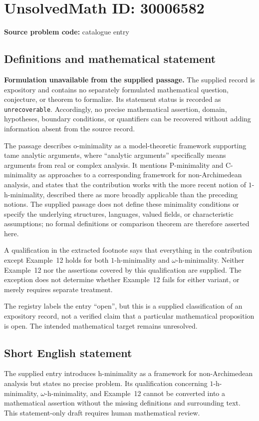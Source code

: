 \documentclass[11pt]{article}
\begin{document}
\section*{UnsolvedMath ID: 30006582}
\textbf{Source problem code:} catalogue entry
\subsection{Definitions and mathematical statement}
\textbf{Formulation unavailable from the supplied passage.} The supplied record is expository and contains no separately formulated mathematical question, conjecture, or theorem to formalize. Its statement status is recorded as \texttt{unrecoverable}. Accordingly, no precise mathematical assertion, domain, hypotheses, boundary conditions, or quantifiers can be recovered without adding information absent from the source record.

The passage describes o-minimality as a model-theoretic framework supporting tame analytic arguments, where ``analytic arguments'' specifically means arguments from real or complex analysis. It mentions P-minimality and C-minimality as approaches to a corresponding framework for non-Archimedean analysis, and states that the contribution works with the more recent notion of \(1\)-h-minimality, described there as more broadly applicable than the preceding notions. The supplied passage does not define these minimality conditions or specify the underlying structures, languages, valued fields, or characteristic assumptions; no formal definitions or comparison theorem are therefore asserted here.

A qualification in the extracted footnote says that everything in the contribution except Example~12 holds for both \(1\)-h-minimality and \(\omega\)-h-minimality. Neither Example~12 nor the assertions covered by this qualification are supplied. The exception does not determine whether Example~12 fails for either variant, or merely requires separate treatment.

The registry labels the entry ``open'', but this is a supplied classification of an expository record, not a verified claim that a particular mathematical proposition is open. The intended mathematical target remains unresolved.
\subsection{Short English statement}
The supplied entry introduces h-minimality as a framework for non-Archimedean analysis but states no precise problem. Its qualification concerning \(1\)-h-minimality, \(\omega\)-h-minimality, and Example~12 cannot be converted into a mathematical assertion without the missing definitions and surrounding text. This statement-only draft requires human mathematical review.
\end{document}
